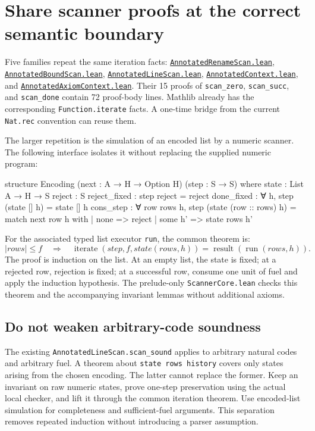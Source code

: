 \documentclass[11pt,letterpaper]{article}
\newcommand{\code}[1]{\nolinkurl{#1}}
\newcommand{\src}[2]{\href{https://github.com/VladimirReshetnikov/ProveIt/blob/60e9c5d620c6c387d932876cfa2d9376f64ea56c/Computability/DiophantineConsistency/Lean/DiophantineConsistency/#1.lean}{\code{#1.lean}}#2}
\begin{document}
\section{Share scanner proofs at the correct semantic boundary}
\label{sec:scanners}

Five families repeat the same iteration facts:
\src{AnnotatedRenameScan}{, }
\src{AnnotatedBoundScan}{, }
\src{AnnotatedLineScan}{, }
\src{AnnotatedContext}{, and }
\src{AnnotatedAxiomContext}{.}
Their 15 proofs of \code{scan_zero}, \code{scan_succ}, and \code{scan_done}
contain 72 proof-body lines. Mathlib already has the corresponding
\code{Function.iterate} facts. A one-time bridge from the current
\code{Nat.rec} convention can reuse them.\cite{mathlib-iterate}

The larger repetition is the simulation of an encoded list by a numeric
scanner. The following interface isolates it without replacing the supplied
numeric program:

\begin{Lean}
structure Encoding (next : A → H → Option H) (step : S → S) where
  state : List A → H → S
  reject : S
  reject_fixed : step reject = reject
  done_fixed : ∀ h, step (state [] h) = state [] h
  cons_step : ∀ row rows h,
    step (state (row :: rows) h) =
      match next row h with
      | none => reject
      | some h' => state rows h'
\end{Lean}

For the associated typed list executor \code{run}, the common theorem is:
\[
 |\mathit{rows}|\le f\quad\Longrightarrow\quad
 \operatorname{iterate}(\mathit{step},f,
     \mathit{state}(\mathit{rows},h))
 =\operatorname{result}(\operatorname{run}(\mathit{rows},h)).
\]
The proof is induction on the list. At an empty list, the state is fixed;
at a rejected row, rejection is fixed; at a successful row, consume one unit
of fuel and apply the induction hypothesis. The prelude-only
\code{ScannerCore.lean} checks this theorem and the accompanying invariant
lemmas without additional axioms.

\subsection{Do not weaken arbitrary-code soundness}

The existing \code{AnnotatedLineScan.scan_sound} applies to arbitrary natural
codes and arbitrary fuel. A theorem about \code{state rows history} covers
only states arising from the chosen encoding. The latter cannot replace the
former. Keep an invariant on raw numeric states, prove one-step preservation
using the actual local checker, and lift it through the common iteration
theorem. Use encoded-list simulation for completeness and sufficient-fuel
arguments. This separation removes repeated induction without introducing a
parser assumption.
\end{document}
